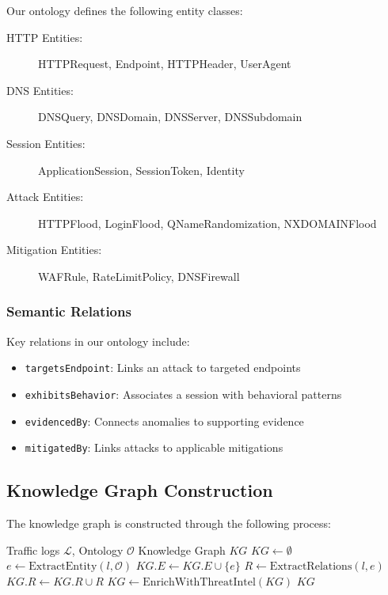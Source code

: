 \documentclass[preprint,12pt]{elsarticle}
\begin{document}
Our ontology defines the following entity classes:

\begin{description}
    \item[HTTP Entities:] HTTPRequest, Endpoint, HTTPHeader, UserAgent
    \item[DNS Entities:] DNSQuery, DNSDomain, DNSServer, DNSSubdomain
    \item[Session Entities:] ApplicationSession, SessionToken, Identity
    \item[Attack Entities:] HTTPFlood, LoginFlood, QNameRandomization, NXDOMAINFlood
    \item[Mitigation Entities:] WAFRule, RateLimitPolicy, DNSFirewall
\end{description}

\subsubsection{Semantic Relations}

Key relations in our ontology include:

\begin{itemize}
    \item \texttt{targetsEndpoint}: Links an attack to targeted endpoints
    \item \texttt{exhibitsBehavior}: Associates a session with behavioral patterns
    \item \texttt{evidencedBy}: Connects anomalies to supporting evidence
    \item \texttt{mitigatedBy}: Links attacks to applicable mitigations
\end{itemize}

\subsection{Knowledge Graph Construction}

The knowledge graph is constructed through the following process:

\begin{algorithm}[H]
\caption{Knowledge Graph Construction}
\begin{algorithmic}[1]
\REQUIRE Traffic logs $\mathcal{L}$, Ontology $\mathcal{O}$
\ENSURE Knowledge Graph $KG$
\STATE $KG \leftarrow \emptyset$
    \STATE $e \leftarrow \text{ExtractEntity}(l, \mathcal{O})$
    \STATE $KG.E \leftarrow KG.E \cup \{e\}$
    \STATE $R \leftarrow \text{ExtractRelations}(l, e)$
    \STATE $KG.R \leftarrow KG.R \cup R$
\ENDFOR
\STATE $KG \leftarrow \text{EnrichWithThreatIntel}(KG)$
\RETURN $KG$
\end{algorithmic}
\end{algorithm}
\end{document}
